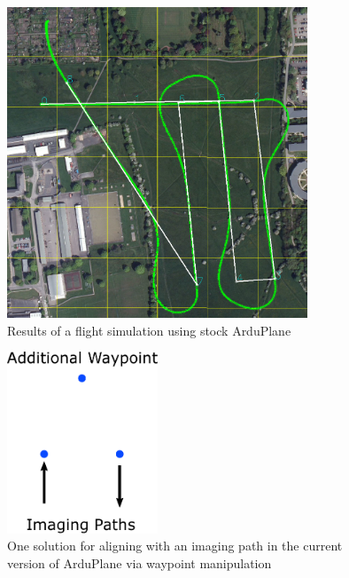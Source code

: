 \begin{figure}[htbp!] 
\centering    
\includegraphics[width=0.8\textwidth]{BaseArduPlane}
\caption[Stock ArduPlane Path Tracking]{Results of a flight simulation using stock ArduPlane}
\label{fig:baseArduPlane}
\end{figure}

\begin{figure}[htbp!] 
\centering    
\includegraphics[width=0.4\textwidth]{WaypointManipulation}
\caption[Aligning With an Imaging Path in Stock ArduPlane]{One solution for aligning with an imaging path in the current version of ArduPlane via waypoint manipulation}
\label{fig:waypoingmanipulation}
\end{figure}

